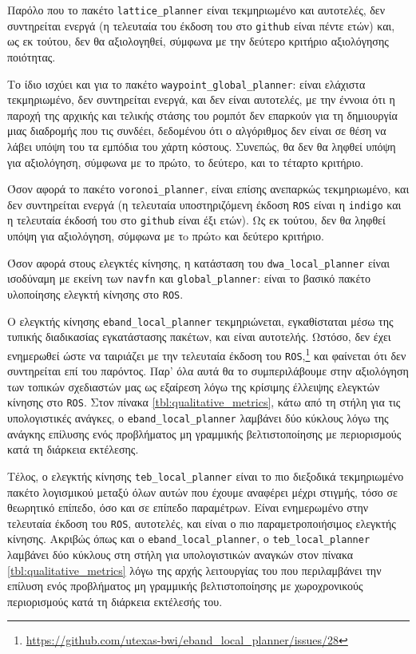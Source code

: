 Παρόλο που το πακέτο \texttt{lattice\_planner} είναι τεκμηριωμένο και
αυτοτελές, δεν συντηρείται ενεργά (η τελευταία του έκδοση του στο
\texttt{github} είναι πέντε ετών) και, ως εκ τούτου, δεν θα αξιολογηθεί,
σύμφωνα με την δεύτερο κριτήριο αξιολόγησης ποιότητας.

Το ίδιο ισχύει και για το πακέτο \texttt{waypoint\_global\_planner}: είναι
ελάχιστα τεκμηριωμένο, δεν συντηρείται ενεργά, και δεν είναι αυτοτελές, με την
έννοια ότι η παροχή της αρχικής και τελικής στάσης του ρομπότ δεν επαρκούν για
τη δημιουργία μιας διαδρομής που τις συνδέει, δεδομένου ότι ο αλγόριθμος δεν
είναι σε θέση να λάβει υπόψη του τα εμπόδια του χάρτη κόστους.  Συνεπώς, θα δεν
θα ληφθεί υπόψη για αξιολόγηση, σύμφωνα με το πρώτο, το δεύτερο, και το τέταρτο
κριτήριο.

Όσον αφορά το πακέτο \texttt{voronoi\_planner}, είναι επίσης ανεπαρκώς
τεκμηριωμένο, και δεν συντηρείται ενεργά (η τελευταία υποστηριζόμενη έκδοση
\texttt{ROS} είναι η \texttt{indigo} και η τελευταία έκδοσή του στο
\texttt{github} είναι έξι ετών). Ως εκ τούτου, δεν θα ληφθεί υπόψη για
αξιολόγηση, σύμφωνα με τo πρώτo και δεύτερο κριτήριο.

Όσον αφορά στους ελεγκτές κίνησης, η κατάσταση του \texttt{dwa\_local\_planner}
είναι ισοδύναμη με εκείνη των \texttt{navfn} και \texttt{global\_planner}:
είναι το βασικό πακέτο υλοποίησης ελεγκτή κίνησης στο \texttt{ROS}.

Ο ελεγκτής κίνησης \texttt{eband\_local\_planner} τεκμηριώνεται, εγκαθίσταται
μέσω της τυπικής διαδικασίας εγκατάστασης πακέτων, και είναι αυτοτελής. Ωστόσο,
δεν έχει ενημερωθεί ώστε να ταιριάζει με την τελευταία έκδοση του
\texttt{ROS},\footnote{\url{https://github.com/utexas-bwi/eband\_local\_planner/issues/28}}
και φαίνεται ότι δεν συντηρείται επί του παρόντος. Παρ' όλα αυτά θα το
συμπεριλάβουμε στην αξιολόγηση των τοπικών σχεδιαστών μας ως εξαίρεση λόγω της
κρίσιμης έλλειψης ελεγκτών κίνησης στο \texttt{ROS}. Στον πίνακα
\ref{tbl:qualitative_metrics}, κάτω από τη στήλη για τις υπολογιστικές ανάγκες,
ο \texttt{eband\_local\_planner} λαμβάνει δύο κύκλους λόγω της ανάγκης επίλυσης
ενός προβλήματος μη γραμμικής βελτιστοποίησης με περιορισμούς κατά τη διάρκεια
εκτέλεσης.

Τέλος, ο ελεγκτής κίνησης \texttt{teb\_local\_planner} είναι το πιο διεξοδικά
τεκμηριωμένο πακέτο λογισμικού μεταξύ όλων αυτών που έχουμε αναφέρει μέχρι
στιγμής, τόσο σε θεωρητικό επίπεδο, όσο και σε επίπεδο παραμέτρων. Είναι
ενημερωμένο στην τελευταία έκδοση του \texttt{ROS}, αυτοτελές, και είναι ο πιο
παραμετροποιήσιμος ελεγκτής κίνησης. Ακριβώς όπως και ο
\texttt{eband\_local\_planner}, ο \texttt{teb\_local\_planner} λαμβάνει δύο
κύκλους στη στήλη για υπολογιστικών αναγκών στον πίνακα
\ref{tbl:qualitative_metrics} λόγω της αρχής λειτουργίας του που περιλαμβάνει
την επίλυση ενός προβλήματος μη γραμμικής βελτιστοποίησης με χωροχρονικούς
περιορισμούς κατά τη διάρκεια εκτέλεσής του.

